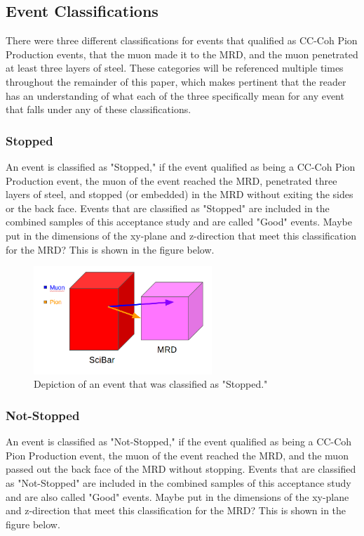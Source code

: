 \documentclass[11pt]{article}
\begin{document}
\subsection{Event Classifications}
There were three different classifications for events that qualified as CC-Coh Pion Production events, that the muon made it to the MRD, and the muon penetrated at least three layers of steel. These categories will be referenced multiple times throughout the remainder of this paper, which makes pertinent that the reader has an understanding of what each of the three specifically mean for any event that falls under any of these classifications.

\subsubsection{Stopped}
An event is classified as "Stopped," if the event qualified as being a CC-Coh Pion Production event, the muon of the event reached the MRD, penetrated three layers of steel, and stopped (or embedded) in the MRD without exiting the sides or the back face. Events that are classified as "Stopped" are included in the combined samples of this acceptance study and are called "Good" events. Maybe put in the dimensions of the xy-plane and z-direction that meet this classification for the MRD? This is shown in the figure below.

\begin{figure}[H]
\centering
\includegraphics[width=0.6\textwidth]{EventClassifications/Stopped.png}
\caption{Depiction of an event that was classified as "Stopped."}
\end{figure}

\subsubsection{Not-Stopped}
An event is classified as "Not-Stopped," if the event qualified as being a CC-Coh Pion Production event, the muon of the event reached the MRD, and the muon passed out the back face of the MRD without stopping. Events that are classified as "Not-Stopped" are included in the combined samples of this acceptance study and are also called "Good" events. Maybe put in the dimensions of the xy-plane and z-direction that meet this classification for the MRD? This is shown in the figure below.
\end{document}
